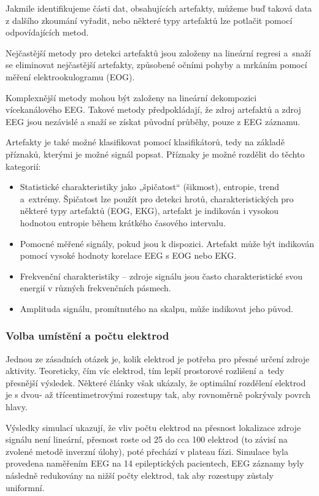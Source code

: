 Jakmile identifikujeme části dat, obsahujících artefakty, můžeme buď taková data z dalšího zkoumání vyřadit, nebo některé typy artefaktů lze potlačit pomocí odpovídajících metod. \cite{13}

Nejčastější metody pro detekci artefaktů jsou založeny na lineární regresi a~snaží se eliminovat nejčastější artefakty, způsobené očními pohyby a mrkáním pomocí měření elektrookulogramu (EOG). \cite{15}

Komplexnější metody mohou být založeny na lineární dekompozici vícekanálového EEG. Takové metody předpokládají, že zdroj artefaktů a zdroj EEG jsou nezávislé a snaží se získat původní průběhy, pouze z EEG záznamu. \cite{15}

Artefakty je také možné klasifikovat pomocí klasifikátorů, tedy na základě příznaků, kterými je možné signál popsat. Příznaky je možné rozdělit do těchto kategorií:

\begin{itemize}
\item Statistické charakteristiky jako „špičatost“ (šikmost), entropie, trend a~extrémy. Špičatost lze použít pro detekci hrotů, charakteristických pro některé typy artefaktů (EOG, EKG), artefakt je indikován i vysokou hodnotou entropie během krátkého časového intervalu. \cite{16}
\item Pomocné měřené signály, pokud jsou k dispozici. Artefakt může být indikován pomocí vysoké hodnoty korelace EEG s EOG nebo EKG. \cite{17}
\item Frekvenční charakteristiky – zdroje signálu jsou často charakteristické svou energií v různých frekvenčních pásmech. \cite{17}
\item Amplituda signálu, promítnutého na skalpu, může indikovat jeho původ. \cite{18}
\end{itemize}

\subsubsection{Volba umístění a počtu elektrod}
Jednou ze zásadních otázek je, kolik elektrod je potřeba pro přesné určení zdroje aktivity. Teoreticky, čím víc elektrod, tím lepší prostorové rozlišení a~tedy přesnější výsledek. Některé články však ukázaly, že optimální rozdělení elektrod je s dvou- až třícentimetrovými rozestupy tak, aby rovnoměrně pokrývaly povrch hlavy. \cite{29,32,31}

Výsledky simulací ukazují, že vliv počtu elektrod na přesnost lokalizace zdroje signálu není lineární, přesnost roste od 25 do cca 100 elektrod (to závisí na zvolené metodě inverzní úlohy), poté přechází v plateau fázi. Simulace byla provedena naměřením EEG na 14 epileptických pacientech, EEG záznamy byly následně redukovány na nižší počty elektrod, tak aby rozestupy zůstaly uniformní.\cite{33}


